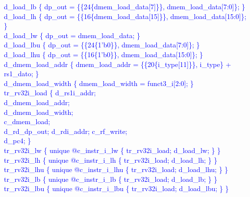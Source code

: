 \textcolor{blue}{
   d\_load\_lb \{ dp\_out = \{\{24\{dmem\_load\_data[7]\}\}, dmem\_load\_data[7:0]\}; \}\\%
\indent d\_load\_lh \{ dp\_out = \{\{16\{dmem\_load\_data[15]\}\},  dmem\_load\_data[15:0]\}; \}\\%
\indent d\_load\_lw \{ dp\_out = dmem\_load\_data; \}\\%
\indent d\_load\_lbu \{ dp\_out = \{\{24\{1'b0\}\}, dmem\_load\_data[7:0]\}; \}\\%
\indent d\_load\_lhu \{ dp\_out = \{\{16\{1'b0\}\}, dmem\_load\_data[15:0]\}; \}\\%
\indent d\_dmem\_load\_addr \{ dmem\_load\_addr = \{\{20\{i\_type[11]\}\}, i\_type\} + rs1\_dato; \}\\%
\indent d\_dmem\_load\_width \{ dmem\_load\_width = funct3\_i[2:0]; \}\\%
\indent tr\_rv32i\_load \{ d\_rs1i\_addr; \\%
\indent \hspace{\parindent} d\_dmem\_load\_addr; \\%
\indent \hspace{\parindent} d\_dmem\_load\_width; \\%
\indent \hspace{\parindent} c\_dmem\_load; \\%
\indent \hspace{\parindent} d\_rd\_dp\_out; d\_rdi\_addr; c\_rf\_write; \\%
\indent \hspace{\parindent} d\_pc4; \} \\%
\indent tr\_rv32i\_lw \{ unique @c\_instr\_i\_lw \{ tr\_rv32i\_load; d\_load\_lw; \} \} \\%
\indent tr\_rv32i\_lh \{ unique @c\_instr\_i\_lh \{ tr\_rv32i\_load; d\_load\_lh; \} \} \\%
\indent tr\_rv32i\_lhu \{ unique @c\_instr\_i\_lhu \{ tr\_rv32i\_load; d\_load\_lhu; \} \} \\%
\indent tr\_rv32i\_lb \{ unique @c\_instr\_i\_lb \{ tr\_rv32i\_load; d\_load\_lb; \} \} \\%
\indent tr\_rv32i\_lbu \{ unique @c\_instr\_i\_lbu \{ tr\_rv32i\_load; d\_load\_lbu; \} \} \\%
}

